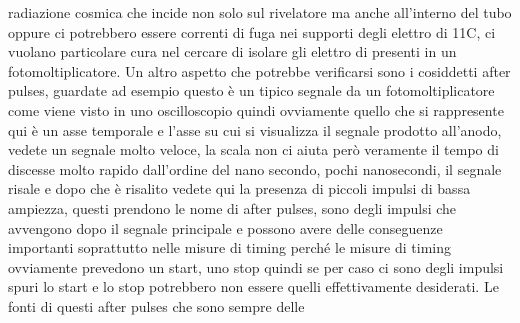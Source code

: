 radiazione cosmica che incide non solo sul rivelatore ma anche all'interno del tubo oppure ci potrebbero essere correnti di fuga nei supporti degli elettro di 11C, ci vuolano particolare cura nel cercare di isolare gli elettro di presenti in un fotomoltiplicatore. Un altro aspetto che potrebbe verificarsi sono i cosiddetti after pulses, guardate ad esempio questo è un tipico segnale da un fotomoltiplicatore come viene visto in uno oscilloscopio quindi ovviamente quello che si rappresente qui è un asse temporale e l'asse su cui si visualizza il segnale prodotto all'anodo, vedete un segnale molto veloce, la scala non ci aiuta però veramente il tempo di discesse molto rapido dall'ordine del nano secondo, pochi nanosecondi, il segnale risale e dopo che è risalito vedete qui la presenza di piccoli impulsi di bassa ampiezza, questi prendono le nome di after pulses, sono degli impulsi che avvengono dopo il segnale principale e possono avere delle conseguenze importanti soprattutto nelle misure di timing perché le misure di timing ovviamente prevedono un start, uno stop quindi se per caso ci sono degli impulsi spuri lo start e lo stop potrebbero non essere quelli effettivamente desiderati. Le fonti di questi after pulses che sono sempre delle 

